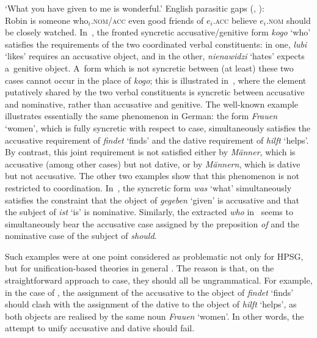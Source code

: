 \documentclass[output=paper]{langsci/langscibook}
\begin{document}
\glt  `What you have given to me is wonderful.’
\z
\ea
\label{ex:syn:epg} 
English parasitic gaps (\citealt[482]{HL96a}, \citealt[205]{LHC2001a-u}): \\ [1ex]
Robin is someone who$_i$.\textsc{nom/acc} even good friends of $e_i$.\textsc{acc} believe $e_i$.\textsc{nom} should be closely watched.
\z
In~, the fronted syncretic accusative/genitive form \emph{kogo} `who’ satisfies the requirements of the two coordinated verbal constituents: in one, \emph{lubi} `likes’ requires an accusative object, and in the other, \emph{nienawidzi} `hates’ expects a~genitive object.  A~form which is not syncretic between (at least) these two cases cannot occur in the place of \emph{kogo}; this is illustrated in~, where the element putatively shared by the two verbal constituents is syncretic between accusative and nominative, rather than accusative and genitive.  The well-known example~ illustrates essentially the same phenomenon in German: the form \emph{Frauen} `women’, which is fully syncretic with respect to case, simultaneously satisfies the accusative requirement of \emph{findet} `finds’ and the dative requirement of \emph{hilft} `helps’.  By contrast, this joint requirement is not satisfied either by \emph{Männer}, which is accusative (among other cases) but not dative, or by \emph{Männern}, which is dative but not accusative.  The other two examples show that this phenomenon is not restricted to coordination.  In~, the syncretic form \emph{was} `what’ simultaneously satisfies the constraint that the object of \emph{gegeben} `given’ is accusative and that the subject of \emph{ist} `is’ is nominative.  Similarly, the extracted \emph{who} in~ seems to simultaneously bear the accusative case assigned by the preposition \emph{of} and the nominative case of the subject of \emph{should}.

Such examples were at one point considered as problematic not only for HPSG, but for unification-based theories in general \citep{Ingria90}.  The reason is that, on the straightforward approach to case, they should all be ungrammatical.  For example, in the case of , the assignment of the accusative to the object of \emph{findet} `finds’ should clash with the assignment of the dative to the object of \emph{hilft} `helps’, as both objects are realised by the same noun \emph{Frauen} `women’.  In other words, the attempt to unify accusative and dative should fail.  
\end{document}

